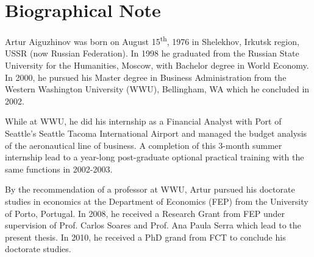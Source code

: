 \chapter*{Biographical Note}
Artur Aiguzhinov was born on August 15\textsuperscript{th},  1976 in Shelekhov, Irkutsk region, USSR (now Russian Federation). In 1998 he graduated from the Russian State University for the Humanities, Moscow, with Bachelor degree in World Economy. In 2000, he pursued his Master degree in Business Administration from the Western Washington University (WWU), Bellingham, WA which  he concluded in 2002. 

While  at WWU, he did his internship as a Financial Analyst with Port of Seattle's Seattle Tacoma International Airport and  managed the budget analysis of the aeronautical line of business. A completion of this 3-month summer internship lead to a year-long post-graduate optional practical training with the same functions in 2002-2003. 

By the recommendation of a professor at WWU, Artur pursued his doctorate studies in economics at the Department  of Economics (FEP) from the University of Porto, Portugal. In 2008, he received a Research Grant from  FEP under supervision of Prof. Carlos Soares and Prof. Ana Paula Serra which lead to the present thesis. In 2010, he received a PhD grand from FCT to conclude his doctorate studies. 

